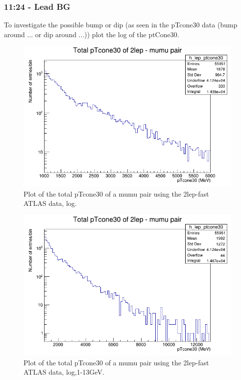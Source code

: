 \subsubsection*{11:24 - Lead BG}
To investigate the possible bump or dip (as seen in the pTcone30 data (bump around ...  or dip around ...)) plot the log of the ptCone30.




\begin{figure}[h!]
    \centering
	\includegraphics[width=0.85\linewidth]{plots/16-02-2021/2lep-fast_mumu_ptcone30(total)_log-entries_1-6GeV_16-02-2021_11-39.png}
	\caption{Plot of the total pTcone30 of a mumu pair using the 2lep-fast ATLAS data, log. }\label{fig:2lep-fast_mumu_ptcone30(total)_log-entries_1-6GeV_16-02-2021_11-39}
\end{figure}




\begin{figure}[h!]
    \centering
	\includegraphics[width=0.85\linewidth]{plots/16-02-2021/2lep-fast_mumu-pair_ptcone30(total)_log-entries_1-13GeV_16-02-2021_11-45.png}
	\caption{Plot of the total pTcone30 of a mumu pair using the 2lep-fast ATLAS data, log,1-13GeV. }\label{fig:2lep-fast_mumu-pair_ptcone30(total)_log-entries_1-13GeV_16-02-2021_11-45}
\end{figure}

